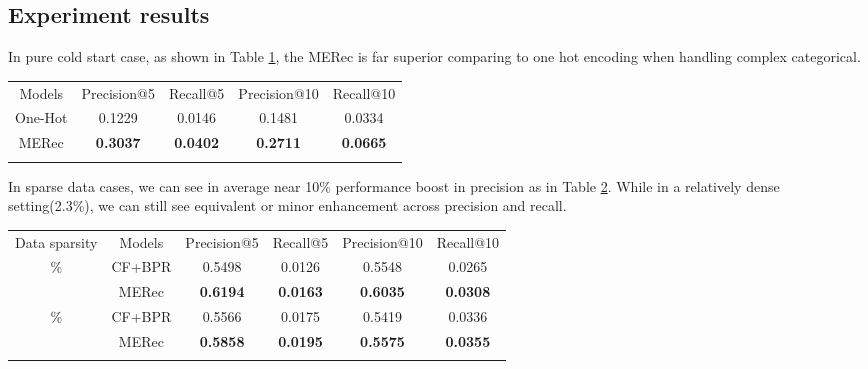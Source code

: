 \subsection{Experiment results}
In pure cold start case, as shown in Table \ref{tbl1}, the MERec is far superior comparing to one hot encoding when handling complex categorical.

\begin{table}
    {\begin{tabular}{@{}ccccc@{}}\toprule
    Models & Precision@5 & Recall@5 & Precision@10 & Recall@10 \\
    \colrule
    One-Hot\hphantom{00} & \hphantom{0} 0.1229 & \hphantom{0} 0.0146 & 0.1481 & 0.0334 \\
    MERec\hphantom{00} & \hphantom{0} \textbf{0.3037} & \hphantom{0} \textbf{0.0402} & \textbf{0.2711} & \textbf{0.0665} \\
    
    \botrule
    \end{tabular}
    }\label{tbl1}
    \end{table}

In sparse data cases, we can see in average near 10\% performance boost in precision as in Table \ref{tbl2}. While in a relatively dense setting(2.3\%), we can still see equivalent or minor enhancement across precision and recall.
\begin{table}
    {\begin{tabular}{@{}cccccc@{}}\toprule
    Data sparsity &Models & Precision@5 & Recall@5 & Precision@10 & Recall@10 \\
    \colrule
    1.1\%&CF+BPR\hphantom{00} & \hphantom{0} 0.5498 & 0.0126 & 0.5548 & 0.0265 \\
    &MERec\hphantom{00} & \hphantom{0} \textbf{0.6194} & \textbf{0.0163} & \textbf{0.6035} & \textbf{0.0308} \\
    \colrule
    2.3\%&CF+BPR\hphantom{00} & 0.5566 & 0.0175 & 0.5419 & 0.0336 \\
    &MERec\hphantom{00} & \hphantom{0} \textbf{0.5858} & \textbf{0.0195} & \textbf{0.5575} & \textbf{0.0355} \\
    \botrule
    \end{tabular}
    }
    \label{tbl2}
\end{table}

